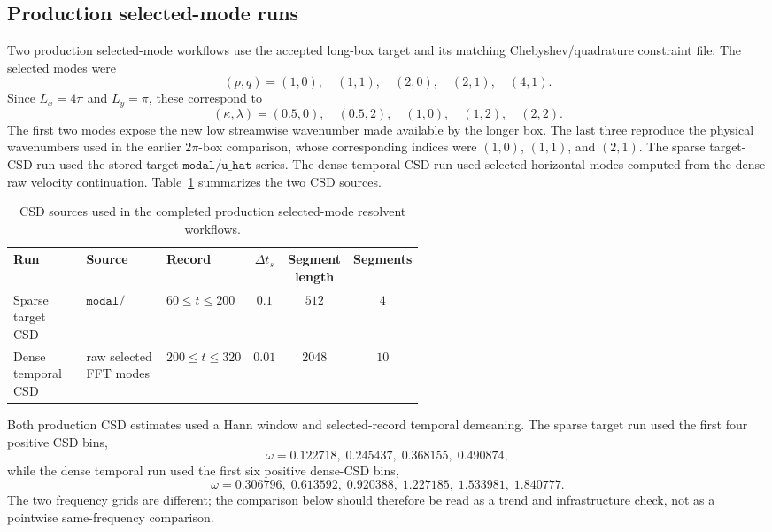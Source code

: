 \documentclass[11pt]{article}
\begin{document}
\subsection{Production selected-mode runs}

Two production selected-mode workflows use the accepted long-box target and
its matching Chebyshev/quadrature constraint file. The selected modes were
\begin{equation}
  (p,q)=(1,0),\quad (1,1),\quad (2,0),\quad (2,1),\quad (4,1).
  \label{eq:resolvent_selected_modes}
\end{equation}
Since \(L_x=4\pi\) and \(L_y=\pi\), these correspond to
\[
  (\kappa,\lambda)=(0.5,0),\quad (0.5,2),\quad
  (1,0),\quad (1,2),\quad (2,2).
\]
The first two modes expose the new low streamwise wavenumber made available by
the longer box. The last three reproduce the physical wavenumbers used in the
earlier \(2\pi\)-box comparison, whose corresponding indices were
\((1,0)\), \((1,1)\), and \((2,1)\).
The sparse target-CSD run used the stored target \(\texttt{modal/u\_hat}\)
series. The dense temporal-CSD run used selected horizontal modes computed
from the dense raw velocity continuation. Table~\ref{tab:resolvent_csd_sources}
summarizes the two CSD sources.

\begin{table}[H]
  \centering
  \caption{CSD sources used in the completed production selected-mode
  resolvent workflows.}
  \label{tab:resolvent_csd_sources}
  \small
  \begin{tabular}{p{0.18\linewidth}p{0.20\linewidth}p{0.16\linewidth}ccc}
    \toprule
    Run & Source & Record & \(\Delta t_s\) & Segment length & Segments \\
    \midrule
    Sparse target CSD
      & \(\texttt{modal/u\_hat}\)
      & \(60\le t\le200\)
      & \(0.1\)
      & \(512\)
      & \(4\) \\
    Dense temporal CSD
      & raw selected FFT modes
      & \(200\le t\le320\)
      & \(0.01\)
      & \(2048\)
      & \(10\) \\
    \bottomrule
  \end{tabular}
\end{table}

Both production CSD estimates used a Hann window and selected-record temporal
demeaning. The sparse target run used the first four positive CSD bins,
\begin{equation}
  \omega =
  0.122718,\;0.245437,\;0.368155,\;0.490874,
  \label{eq:resolvent_sparse_omega}
\end{equation}
while the dense temporal run used the first six positive dense-CSD bins,
\begin{equation}
  \omega =
  0.306796,\;0.613592,\;0.920388,\;1.227185,\;1.533981,\;1.840777.
  \label{eq:resolvent_dense_omega}
\end{equation}
The two frequency grids are different; the comparison below should therefore
be read as a trend and infrastructure check, not as a pointwise same-frequency
comparison.
\end{document}
